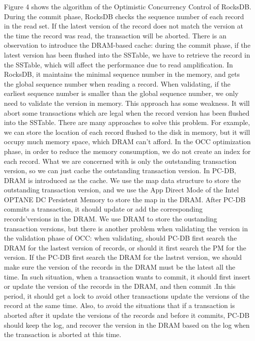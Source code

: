 Figure 4 shows the algorithm of the Optimistic Concurrency Control of RocksDB. 
During the commit phase, RocksDB checks the sequence number of each record in the read set. 
If the latest version of the record does not match the version at the time the record was read, 
the transaction will be aborted. 
There is an observation to introduce the DRAM-based cache: during the commit phase, 
if the latest version has been flushed into the SSTable, 
we have to retrieve the record in the SSTable, 
which will affect the performance due to read amplification. 
In RocksDB, it maintains the minimal sequence number in the memory, 
and gets the global sequence number when reading a record. 
When validating, if the earliest sequence number is smaller than the global sequence number, 
we only need to validate the version in memory. 
This approach has some weakness. 
It will abort some transactions which are legal when the record version has been flushed into the SSTable. 
There are many approaches to solve this problem. 
For example, we can store the location of each record flushed to the disk in memory, but it will occupy much memory space, which DRAM can't afford. 
In the OCC optimization phase, 
in order to reduce the memory consumption, we do not create an index for each record. 
What we are concerned with is only the outstanding transaction version, 
so we can just cache the outstanding transaction version. 
In PC-DB, DRAM is introduced as the cache. 
We use the map data structure to store the outstanding transaction version, 
and we use the App Direct Mode of the Intel OPTANE DC Persistent Memory to store the map in the DRAM. 
After PC-DB commits a transaction, it should update or add the corresponding records’versions in the DRAM. 
We use DRAM to store the oustanding transaction versions, 
but there is another problem when validating the version in the validation phase of OCC: when validating, 
should PC-DB first search the DRAM for the lastest version of records, or  should it first search the PM for the version. 
If the PC-DB first search the DRAM for the lastrst version, we should make sure the version of the records in the DRAM must be the latest all the time. 
In such situation, when a transaction wants to commit, it should first insert or update the version of the records in the DRAM, 
and then commit .In this period, it should get a lock to avoid other transactions update the versions of the record at the same time. Also, to avoid the situations that if a transaction is aborted after it update the versions of the records 
and before it commits, PC-DB should keep the log, and recover the version in the DRAM based on the log when the transaction is aborted at this time. 
